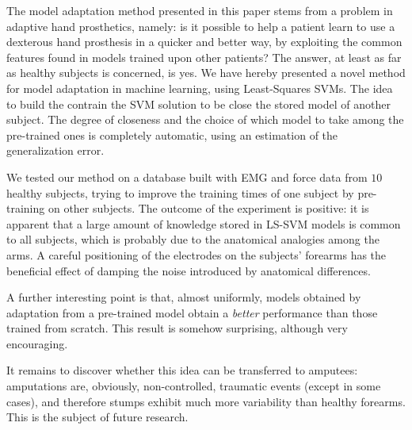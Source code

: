 The model adaptation method presented in this paper stems from a
problem in adaptive hand prosthetics, namely: is it possible to help a
patient learn to use a dexterous hand prosthesis in a quicker and
better way, by exploiting the common features found in models trained
upon other patients? The answer, at least as far as healthy subjects
is concerned, is yes. We have hereby presented a novel method for
model adaptation in machine learning, using Least-Squares SVMs. The
idea to build the contrain the SVM solution to be close the stored model
of another subject. The degree of closeness and the choice of which model
to take among the pre-trained ones is completely automatic, using an estimation
of the generalization error.

We tested our method on a database built with EMG and force data from
$10$ healthy subjects, trying to improve the training times of one
subject by pre-training on other subjects. The outcome of the
experiment is positive: it is apparent that a large amount of
knowledge stored in LS-SVM models is common to all subjects, which is
probably due to the anatomical analogies among the arms. A careful
positioning of the electrodes on the subjects' forearms has the
beneficial effect of damping the noise introduced by anatomical
differences.

A further interesting point is that, almost uniformly, models obtained
by adaptation from a pre-trained model obtain a \emph{better}
performance than those trained from scratch. This result is somehow
surprising, although very encouraging.

It remains to discover whether this idea can be transferred to
amputees: amputations are, obviously, non-controlled, traumatic events
(except in some cases), and therefore stumps exhibit much more
variability than healthy forearms. This is the subject of future
research.
